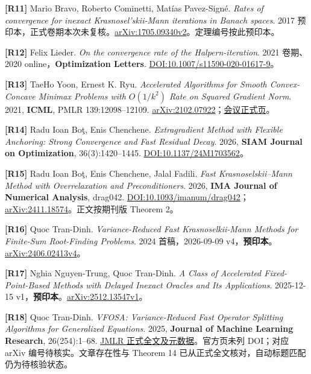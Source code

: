 \documentclass[
  chinese,
  10pt,
  a4paper,
]{article}
\begin{document}
\textbf{{[}R11{]}} Mario Bravo, Roberto Cominetti, Matías Pavez-Signé.
\emph{Rates of convergence for inexact Krasnosel'skii-Mann iterations in
Banach spaces}. 2017
预印本，正式卷期本次未复核。\href{https://arxiv.org/abs/1705.09340v2}{arXiv:1705.09340v2}。定理编号按此预印本。

\textbf{{[}R12{]}} Felix Lieder. \emph{On the convergence rate of the
Halpern-iteration}. 2021 卷期、2020 online，\textbf{Optimization
Letters}.
\href{https://doi.org/10.1007/s11590-020-01617-9}{DOI:10.1007/s11590-020-01617-9}。

\textbf{{[}R13{]}} TaeHo Yoon, Ernest K. Ryu. \emph{Accelerated
Algorithms for Smooth Convex-Concave Minimax Problems with \(O(1/k^2)\)
Rate on Squared Gradient Norm}. 2021, \textbf{ICML}, PMLR
139:12098--12109.
\href{https://arxiv.org/abs/2102.07922}{arXiv:2102.07922}；\href{https://proceedings.mlr.press/v139/yoon21d.html}{会议正式页}。

\textbf{{[}R14{]}} Radu Ioan Boţ, Enis Chenchene. \emph{Extragradient
Method with Flexible Anchoring: Strong Convergence and Fast Residual
Decay}. 2026, \textbf{SIAM Journal on Optimization}, 36(3):1420--1445.
\href{https://doi.org/10.1137/24M1703562}{DOI:10.1137/24M1703562}。

\textbf{{[}R15{]}} Radu Ioan Boţ, Enis Chenchene, Jalal Fadili.
\emph{Fast Krasnoselskii--Mann Method with Overrelaxation and
Preconditioners}. 2026, \textbf{IMA Journal of Numerical Analysis},
drag042.
\href{https://doi.org/10.1093/imanum/drag042}{DOI:10.1093/imanum/drag042}；\href{https://arxiv.org/abs/2411.18574}{arXiv:2411.18574}。正文按期刊版
Theorem 2。

\textbf{{[}R16{]}} Quoc Tran-Dinh. \emph{Variance-Reduced Fast
Krasnoselkii-Mann Methods for Finite-Sum Root-Finding Problems}. 2024
首稿，2026-09-09
v4，\textbf{预印本}。\href{https://arxiv.org/abs/2406.02413v4}{arXiv:2406.02413v4}。

\textbf{{[}R17{]}} Nghia Nguyen-Trung, Quoc Tran-Dinh. \emph{A Class of
Accelerated Fixed-Point-Based Methods with Delayed Inexact Oracles and
Its Applications}. 2025-12-15
v1，\textbf{预印本}。\href{https://arxiv.org/abs/2512.13547v1}{arXiv:2512.13547v1}。

\textbf{{[}R18{]}} Quoc Tran-Dinh. \emph{VFOSA: Variance-Reduced Fast
Operator Splitting Algorithms for Generalized Equations}. 2025,
\textbf{Journal of Machine Learning Research}, 26(254):1--68.
\href{https://www.jmlr.org/papers/v26/25-0500.html}{JMLR
正式全文及元数据}。官方页未列 DOI；对应 arXiv 编号待核实。文章存在性与
Theorem 14 已从正式全文核对，自动标题匹配仍为待核验状态。
\end{document}

